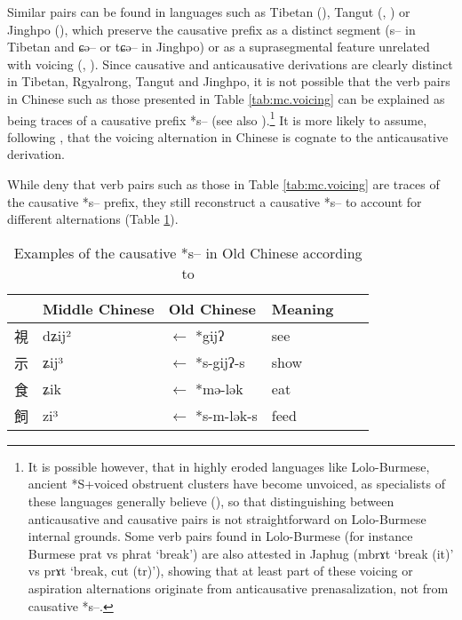 \documentclass[oldfontcommands,oneside,a4paper,11pt]{article}
\newcommand{\ipa}[1]{{\phon \mbox{#1}}} %
\newcommand{\zh}[1]{{\cn #1}}
\begin{document}
Similar pairs can be found in languages such as Tibetan (\citealt{jacques12internal, hill14voicing}), Tangut (\citealt{gong88alternations}, \citealt[245-8]{jacques14esquisse}) or Jinghpo (\citealt[78]{dai90yufa}), which preserve the causative prefix as a distinct segment (\ipa{s--} in Tibetan and \ipa{ɕə--} or \ipa{tɕə--} in Jinghpo) or as a suprasegmental feature unrelated with voicing (\citealt{gong99jinyuanyin}, \citealt[250-1]{jacques14esquisse}). Since causative and anticausative derivations are clearly distinct in Tibetan, Rgyalrong, Tangut and Jinghpo, it is not possible that the verb pairs in Chinese such as those presented in Table \ref{tab:mc.voicing} can be explained as being traces of a causative prefix *\ipa{s--} (see also \citealt{lapolla03}).\footnote{It is possible however, that in highly eroded languages like Lolo-Burmese, ancient *S+voiced obstruent clusters have become unvoiced, as specialists of these languages generally believe (\citealt{bradley79, gerner07caus}), so that distinguishing between anticausative and causative pairs is not straightforward on Lolo-Burmese internal grounds. Some verb pairs found in Lolo-Burmese (for instance Burmese \ipa{prat} vs \ipa{phrat} `break') are also attested in Japhug (\ipa{mbrɤt} `break (it)' vs \ipa{prɤt} `break, cut (tr)'), showing that at least part of these voicing or aspiration alternations originate from anticausative prenasalization, not from causative *\ipa{s--}.  } It is more likely to assume, following  \citet{sagart12sprefix}, that the voicing alternation in Chinese is cognate to the anticausative derivation.

While \citet{sagart12sprefix} deny that verb pairs such as those in Table \ref{tab:mc.voicing} are traces of the causative *\ipa{s--} prefix, they still reconstruct a causative *\ipa{s--} to account for different alternations (Table \ref{tab:caus.oc}).
   \begin{table}[h]
\caption{Examples of the causative *\ipa{s--} in Old Chinese according to \citet{sagart12sprefix}}\label{tab:caus.oc} \centering
\begin{tabular}{llllll}
\toprule
  &Middle Chinese  &Old Chinese &Meaning \\
  \midrule
  \zh{視}& \ipa{dʑij²} &$\leftarrow$ *\ipa{gijʔ}  & see \\
\zh{示}& \ipa{ʑij³} &$\leftarrow$ *\ipa{s-gijʔ-s}  & show \\
\zh{食}& \ipa{ʑik} &$\leftarrow$ *\ipa{mə-lək}  & eat \\
\zh{飼}& \ipa{zi³} &$\leftarrow$ *\ipa{s-m-lək-s}  & feed \\
\bottomrule
\end{tabular}
\end{table}
\end{document}

